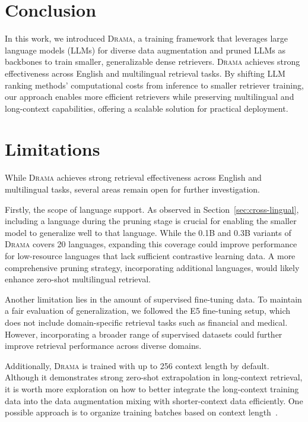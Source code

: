 \documentclass[]{fairmeta}
\newcommand{\ourmodel}{\textsc{Drama}}
\begin{document}
\section{Conclusion}
In this work, we introduced \ourmodel{}, a training framework that leverages large language models (LLMs) for diverse data augmentation and pruned LLMs as backbones to train smaller, generalizable dense retrievers.
\ourmodel{} achieves strong effectiveness across English and multilingual retrieval tasks.
By shifting LLM ranking methods' computational costs from inference to smaller retriever training, our approach enables more efficient retrievers while preserving multilingual and long-context capabilities, offering a scalable solution for practical deployment.

\section*{Limitations}
While \ourmodel{} achieves strong retrieval effectiveness across English and multilingual tasks, several areas remain open for further investigation.

Firstly, the scope of language support.
As observed in Section~\ref{sec:cross-lingual}, including a language during the pruning stage is crucial for enabling the smaller model to generalize well to that language. 
While the 0.1B and 0.3B variants of \ourmodel{} covers 20 languages, expanding this coverage could improve performance for low-resource languages that lack sufficient contrastive learning data.
A more comprehensive pruning strategy, incorporating additional languages, would likely enhance zero-shot multilingual retrieval.

Another limitation lies in the amount of supervised fine-tuning data. To maintain a fair evaluation of generalization, we followed the E5 fine-tuning setup, which does not include domain-specific retrieval tasks such as financial and medical.
However, incorporating a broader range of supervised datasets could further improve retrieval performance across diverse domains.

Additionally, \ourmodel{} is trained with up to 256 context length by default.
Although it demonstrates strong zero-shot extrapolation in long-context retrieval, it is worth more exploration on how to better integrate the long-context training data into the data augmentation mixing with shorter-context data efficiently.
One possible approach is to organize training batches based on context length~\citep{chen-etal-2024-m3}.
\end{document}
